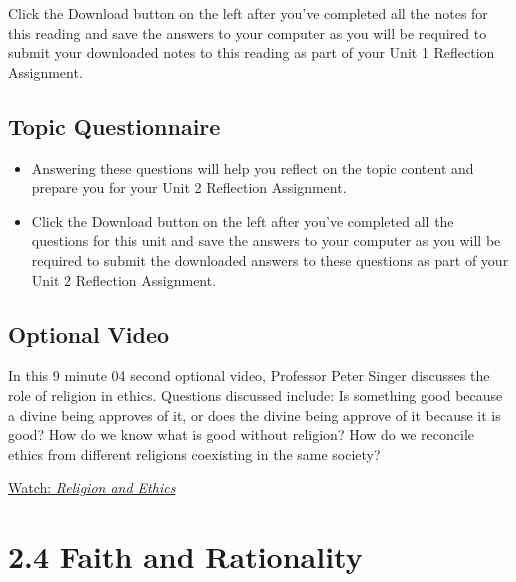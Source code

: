 \documentclass[
]{book}
\providecommand{\tightlist}{%
  \setlength{\itemsep}{0pt}\setlength{\parskip}{0pt}}
\begin{document}
\begin{reflect}
Click the Download button on the left after you've completed all the notes for this reading and save the answers to your computer as you will be required to submit your downloaded notes to this reading as part of your Unit 1 Reflection Assignment.
\end{reflect}

\hypertarget{topic-questionnaire-6}{%
\subsection*{Topic Questionnaire}\label{topic-questionnaire-6}}

\begin{reflect}
\begin{itemize}
\tightlist
\item
  Answering these questions will help you reflect on the topic content and prepare you for your Unit 2 Reflection Assignment.
\item
  Click the Download button on the left after you've completed all the questions for this unit and save the answers to your computer as you will be required to submit the downloaded answers to these questions as part of your Unit 2 Reflection Assignment.
\end{itemize}
\end{reflect}

\hypertarget{optional-video-6}{%
\subsection*{Optional Video}\label{optional-video-6}}

\begin{reflect}
In this 9 minute 04 second optional video, Professor Peter Singer discusses the role of religion in ethics. Questions discussed include: Is something good because a divine being approves of it, or does the divine being approve of it because it is good? How do we know what is good without religion? How do we reconcile ethics from different religions coexisting in the same society?

\href{https://www.youtube.com/watch?v=w9QtjQ5Ow7Y}{Watch: \emph{Religion and Ethics}}
\end{reflect}

\hypertarget{faith-and-rationality}{%
\section*{2.4 Faith and Rationality}\label{faith-and-rationality}}
\end{document}
